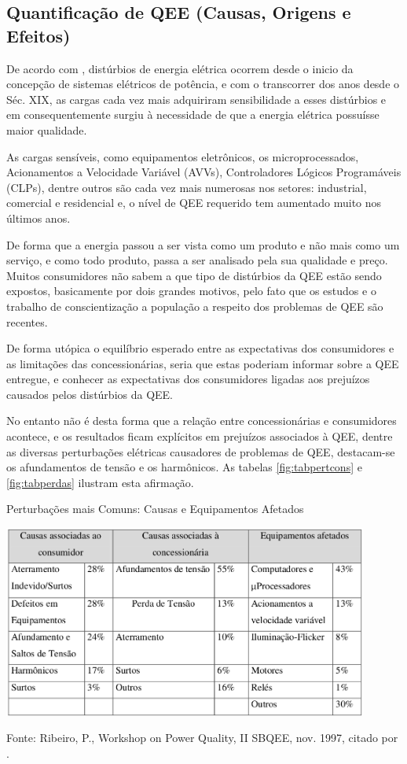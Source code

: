 \subsection{Quantificação de QEE (Causas, Origens e Efeitos)}
\par
De acordo com \cite{ALV10}, distúrbios de energia elétrica ocorrem desde o inicio da concepção de sistemas elétricos de potência, e com o transcorrer dos anos desde o Séc. XIX, as cargas cada vez mais adquiriram sensibilidade a esses distúrbios e em consequentemente surgiu à necessidade de que a energia elétrica possuísse maior qualidade.
\par
As cargas sensíveis, como equipamentos eletrônicos, os microprocessados, Acionamentos a Velocidade Variável (AVVs), Controladores Lógicos Programáveis (CLPs), dentre outros são cada vez mais numerosas nos setores: industrial, comercial e residencial e, o nível de QEE requerido tem aumentado muito nos últimos anos. 
\par De forma que a energia passou a ser vista como um produto e não mais como um serviço, e como todo produto, passa a ser analisado pela sua qualidade e preço. Muitos consumidores não sabem a que tipo de distúrbios da QEE estão sendo expostos, basicamente por dois grandes motivos, pelo fato que os estudos e o trabalho de conscientização a população a respeito dos problemas de QEE são recentes. 
\par
De forma utópica o equilíbrio esperado entre as expectativas dos consumidores e as limitações das concessionárias, seria que estas poderiam informar sobre a QEE entregue, e conhecer as expectativas dos consumidores ligadas aos prejuízos causados pelos distúrbios da QEE.
\par
No entanto não é desta forma que a relação entre concessionárias e consumidores acontece, e os resultados ficam explícitos em prejuízos associados à QEE, dentre as diversas perturbações elétricas causadores de problemas de QEE, destacam-se os afundamentos de tensão e os harmônicos. As tabelas \ref{fig:tabpertcons} e \ref{fig:tabperdas} ilustram esta afirmação.
\begin{table}[!h]
\begin{center}
\caption{Perturbações mais Comuns: Causas e Equipamentos Afetados}
\includegraphics[width=12cm]{imagens/tab2-cap2.png}
\par{\small Fonte: Ribeiro, P., Workshop on Power Quality, II SBQEE, nov. 1997, citado por 
\cite{ALV10}.}
\label{fig:tabpertcons}
\end{center}
\end{table}
